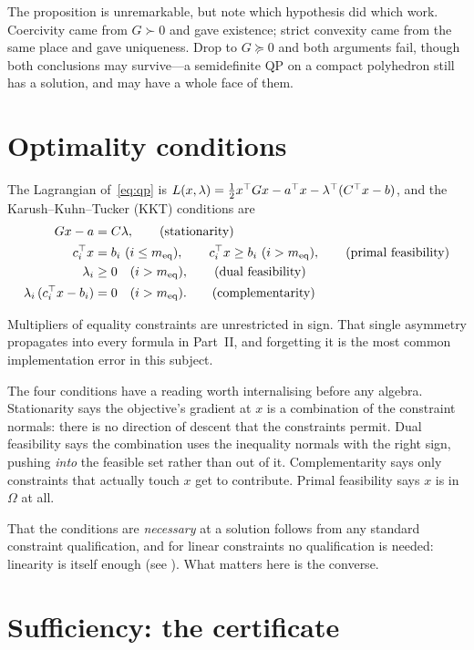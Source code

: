 The proposition is unremarkable, but note which hypothesis did which work.
Coercivity came from $G \succ 0$ and gave existence; strict convexity came from
the same place and gave uniqueness. Drop to $G \succeq 0$ and both arguments fail,
though both conclusions may survive---a semidefinite QP on a compact polyhedron
still has a solution, and may have a whole face of them.

\section{Optimality conditions}

The Lagrangian of~\eqref{eq:qp} is
$L(x,\lambda) = \tfrac12 x^{\top} G x - a^{\top} x - \lambda^{\top}(C^{\top} x - b)$, and the
Karush--Kuhn--Tucker (KKT) conditions are
\begin{align}
  G x - a &= C \lambda, \tag{stationarity}\label{eq:stat}\\
  c_i^{\top} x &= b_i \ (i \le m_{\mathrm{eq}}), \qquad
  c_i^{\top} x \ge b_i \ (i > m_{\mathrm{eq}}), \tag{primal feasibility}\label{eq:pfeas}\\
  \lambda_i &\ge 0 \quad (i > m_{\mathrm{eq}}), \tag{dual feasibility}\label{eq:dfeas}\\
  \lambda_i\,(c_i^{\top} x - b_i) &= 0 \quad (i > m_{\mathrm{eq}}).
      \tag{complementarity}\label{eq:comp}
\end{align}

Multipliers of equality constraints are unrestricted in sign. That single
asymmetry propagates into every formula in Part~II, and forgetting it is the most
common implementation error in this subject.

The four conditions have a reading worth internalising before any algebra.
Stationarity says the objective's gradient at $x$ is a combination of the
constraint normals: there is no direction of descent that the constraints permit.
Dual feasibility says the combination uses the inequality normals with the right
sign, pushing \emph{into} the feasible set rather than out of it. Complementarity
says only constraints that actually touch $x$ get to contribute. Primal
feasibility says $x$ is in $\Omega$ at all.

That the conditions are \emph{necessary} at a solution follows from any standard
constraint qualification, and for linear constraints no qualification is needed:
linearity is itself enough (see \cite[Ch.~12]{nocedal2006}). What matters here is
the converse.

\section{Sufficiency: the certificate}
\label{sec:certificate-principle}

